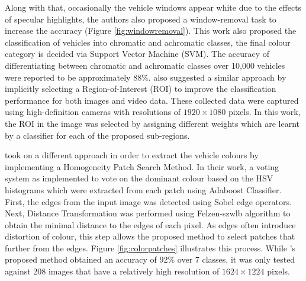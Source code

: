 Along with that, occasionally the vehicle windows appear white due to the effects of specular highlights, the authors also proposed a window-removal task to increase the accuracy (Figure \ref{fig:windowremoval}). This work also proposed the classification of vehicles into chromatic and achromatic classes, the final colour category is decided via Support Vector Machine (SVM). The accuracy of differentiating between chromatic and achromatic classes over 10,000 vehicles were reported to be approximately 88\%.  also suggested a similar approach by implicitly selecting a Region-of-Interest (ROI) to improve the classification performance for both images and video data. These collected data were captured using high-definition cameras with resolutions of $1920 \times 1080$ pixels. In this work, the ROI in the image was selected by assigning different weights which are learnt by a classifier for each of the proposed sub-regions. 

 took on a different approach in order to extract the vehicle colours by implementing a Homogeneity Patch Search Method. In their work, a voting system as implemented to vote on the dominant colour based on the HSV histograms which were extracted from each patch using Adaboost Classifier. First, the edges from the input image was detected using Sobel edge operators. Next, Distance Transformation was performed using Felzen-szwlb algorithm to obtain the minimal distance to the edges of each pixel. As edges often introduce distortion of colour, this step allows the proposed method to select patches that further from the edges. Figure \ref{fig:colorpatches} illustrates this process. While 's proposed method obtained an accuracy of 92\% over 7 classes, it was only tested against 208 images that have a relatively high resolution of $1624 \times 1224$ pixels.


